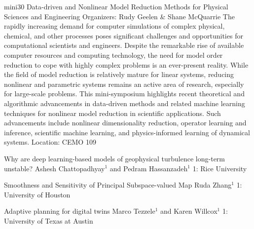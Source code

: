 \mini
{mini30}
{Data-driven and Nonlinear Model Reduction Methods for Physical Sciences and Engineering}
{Organizers: Rudy Geelen \& Shane McQuarrie}
{The rapidly increasing demand for computer simulations of complex physical, chemical, and other processes poses significant challenges and opportunities for computational scientists and engineers. Despite the remarkable rise of available computer resources and computing technology, the need for model order reduction to cope with highly complex problems is an ever-present reality. While the field of model reduction is relatively mature for linear systems, reducing nonlinear and parametric systems remains an active area of research, especially for large-scale problems. This mini-symposium highlights recent theoretical and algorithmic advancements in data-driven methods and related machine learning techniques for nonlinear model reduction in scientific applications. Such advancements include nonlinear dimensionality reduction, operator learning and inference, scientific machine learning, and physics-informed learning of dynamical systems.}
{Location: CEMO 109}

\begin{talks}
\item\talk
{Why are deep learning-based models of geophysical turbulence long-term unstable?}
{Ashesh Chattopadhyay$^1$ and Pedram Hassanzadeh$^1$}
{1: Rice University}
\item\talk
{Smoothness and Sensitivity of Principal Subspace-valued Map}
{Ruda Zhang$^{1}$}
{1: University of Houston}
\item\talk
{Adaptive planning for digital twins}
{Marco Tezzele$^{1}$ and Karen Willcox$^{1}$}
{1: University of Texas at Austin}
\end{talks}
\room
